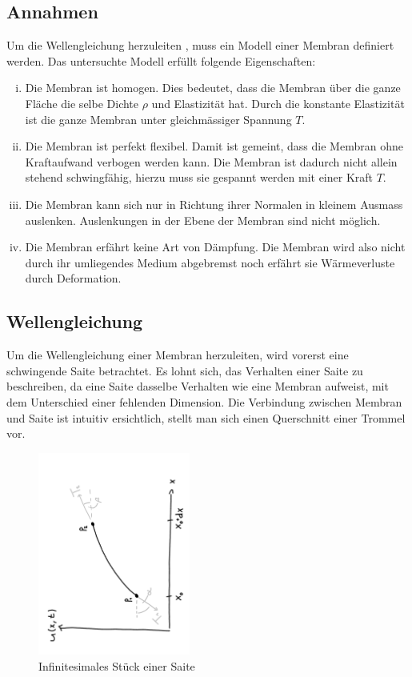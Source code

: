 \subsection{Annahmen} \label{kreimembran:annahmen}
Um die Wellengleichung herzuleiten \cite{kreismembran:wellengleichung_herleitung}, muss ein Modell einer Membran definiert werden. 
Das untersuchte Modell erfüllt folgende Eigenschaften:
\begin{enumerate}[i)]
	\item Die Membran ist homogen. 
	Dies bedeutet, dass die Membran über die ganze Fläche die selbe Dichte $ \rho $  und Elastizität hat. 
	Durch die konstante Elastizität ist die ganze Membran unter gleichmässiger Spannung $ T $.
	\item Die Membran ist perfekt flexibel. 
	Damit ist gemeint, dass die Membran ohne Kraftaufwand verbogen werden kann. 
	Die Membran ist dadurch nicht allein stehend schwingfähig, hierzu muss sie gespannt werden mit einer Kraft $ T $.
	\item Die Membran kann sich nur in Richtung ihrer Normalen in kleinem Ausmass auslenken.
	Auslenkungen in der Ebene der Membran sind nicht möglich.
	\item Die Membran erfährt keine Art von Dämpfung. 
	Die Membran wird also nicht durch ihr umliegendes Medium abgebremst noch erfährt sie Wärmeverluste durch Deformation.
	
\end{enumerate}

\subsection{Wellengleichung} Um die Wellengleichung einer Membran herzuleiten, wird vorerst eine schwingende Saite betrachtet.
Es lohnt sich, das Verhalten einer Saite zu beschreiben, da eine Saite dasselbe Verhalten wie eine Membran aufweist, mit dem Unterschied einer fehlenden Dimension.
Die Verbindung zwischen Membran und Saite ist intuitiv ersichtlich, stellt man sich einen Querschnitt einer Trommel vor.
\begin{figure}
	
	\begin{center}		
		\includegraphics[width=5cm,angle=-90]{papers/kreismembran/images/Saite.pdf}
		\caption{Infinitesimales Stück einer Saite}
		\label{kreismembran:im:Saite}
	\end{center}	
\end{figure}

